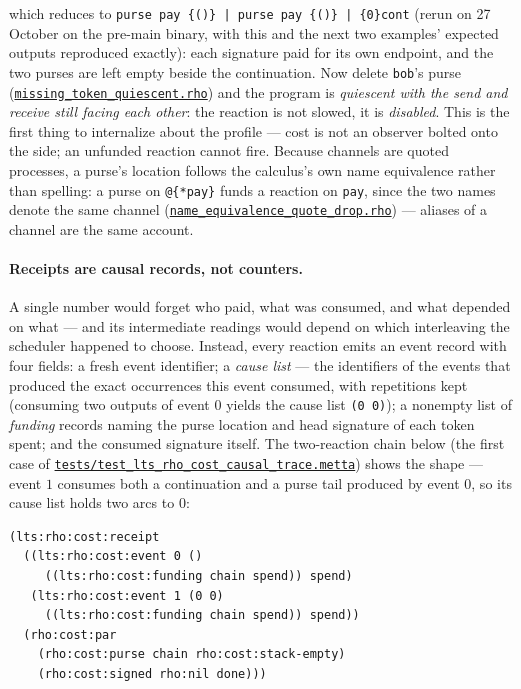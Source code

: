 \documentclass[11pt]{article}
\newcommand{\code}[1]{\texttt{#1}}
\begin{document}
\noindent
which reduces to \code{purse pay \{()\} | purse pay \{()\} | \{0\}cont} (rerun on 27 October on
the pre-main binary, with this and the next two examples' expected outputs reproduced exactly):
each signature paid
for its own endpoint, and the two purses are left empty beside the continuation. Now delete
\code{bob}'s purse
(\href{https://github.com/zariuq/CeTTa/blob/e23de3043462d80e27f9c9009bd0f1b955ed140c/tests/rhocalc_cost_run/missing_token_quiescent.rho}{\code{missing\_token\_quiescent.rho}}) and
the program is \emph{quiescent with the send and receive still facing each other}: the
reaction is not slowed, it is \emph{disabled}. This is the first thing to internalize about
the profile --- cost is not an observer bolted onto the side; an unfunded reaction cannot
fire. Because channels are quoted processes, a purse's location follows the calculus's own
name equivalence rather than spelling: a purse on \code{@\{*pay\}} funds a reaction on
\code{pay}, since the two names denote the same channel
(\href{https://github.com/zariuq/CeTTa/blob/e23de3043462d80e27f9c9009bd0f1b955ed140c/tests/rhocalc_cost_run/name_equivalence_quote_drop.rho}{\code{name\_equivalence\_quote\_drop.rho}}) ---
aliases of a channel are the same account.

\paragraph{Receipts are causal records, not counters.} A single number would forget who
paid, what was consumed, and what depended on what --- and its intermediate readings would
depend on which interleaving the scheduler happened to choose. Instead, every reaction emits
an event record with four fields: a fresh event identifier; a \emph{cause list} --- the
identifiers of the events that produced the exact occurrences this event consumed, with
repetitions kept (consuming two outputs of event $0$ yields the cause list \code{(0 0)}); a
nonempty list of \emph{funding} records naming the purse location and head signature of each
token spent; and the consumed signature itself. The two-reaction chain below (the first case
of
\href{https://github.com/zariuq/CeTTa/blob/e23de3043462d80e27f9c9009bd0f1b955ed140c/tests/test_lts_rho_cost_causal_trace.metta}{\code{tests/test\_lts\_rho\_cost\_causal\_trace.metta}})
shows the shape --- event $1$ consumes both a continuation and a purse tail produced by
event $0$, so its cause list holds two arcs to $0$:

\begin{lstlisting}
(lts:rho:cost:receipt
  ((lts:rho:cost:event 0 ()
     ((lts:rho:cost:funding chain spend)) spend)
   (lts:rho:cost:event 1 (0 0)
     ((lts:rho:cost:funding chain spend)) spend))
  (rho:cost:par
    (rho:cost:purse chain rho:cost:stack-empty)
    (rho:cost:signed rho:nil done)))
\end{lstlisting}
\end{document}
